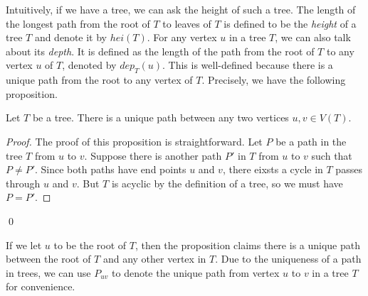 Intuitively, if we have a tree, we can ask the height of such a tree. The length of the longest path from the root of $T$ to leaves of $T$ is defined to be the {\it{height}} of a tree $T$ and denote it by $hei(T)$. For any vertex $u$ in a tree $T$, we can also talk about its {\it{depth}}. It is defined as the length of the path from the root of $T$ to any vertex $u$ of $T$, denoted by $dep_T(u)$. This is well-defined because there is a unique path from the root to any vertex of $T$. Precisely, we have the following proposition. 

\begin{proposition}
\label{prop:unique path}
Let $T$ be a tree. There is a unique path between any two vertices $u, v \in V(T)$. 
\end{proposition}

\begin{proof}
The proof of this proposition is straightforward. Let $P$ be a path in the tree $T$ from $u$ to $v$. Suppose there is another path $P'$ in $T$ from $u$ to $v$ such that $P \neq P'$. Since both paths have end points $u$ and $v$, there eixsts a cycle in $T$ passes through $u$ and $v$. But $T$ is acyclic by the definition of a tree, so we must have $P=P'$.
\end{proof}
\qed

If we let $u$ to be the root of $T$, then the proposition claims there is a unique path between the root of $T$ and any other vertex in $T$. Due to the uniqueness of a path in trees, we can use $P_{uv}$ to denote the unique path from vertex $u$ to $v$ in a tree $T$ for convenience. 

